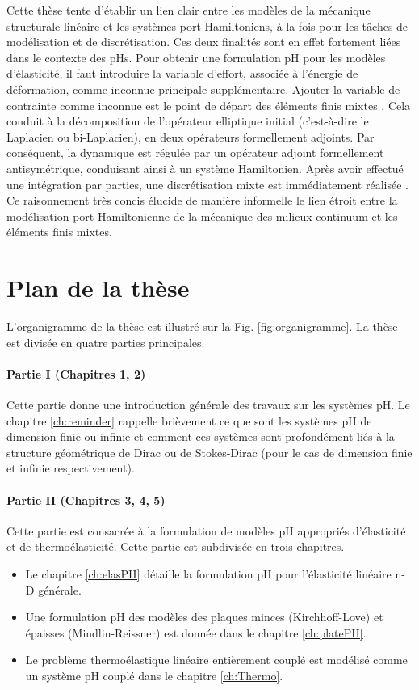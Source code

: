 Cette thèse tente d'établir un lien clair entre les modèles de la mécanique structurale linéaire et les systèmes port-Hamiltoniens, à la fois pour les tâches de modélisation et de discrétisation. Ces deux finalités sont en effet fortement liées dans le contexte des pHs. Pour obtenir une formulation pH pour les modèles d'élasticité, il faut introduire la variable d'effort, associée à l'énergie de déformation, comme inconnue principale supplémentaire. Ajouter la variable de contrainte comme inconnue est le point de départ des éléments finis mixtes \cite{arnold1990intro}. Cela conduit à la décomposition de l'opérateur elliptique initial (c'est-à-dire le Laplacien ou bi-Laplacien), en deux opérateurs formellement adjoints. Par conséquent, la dynamique est régulée par un opérateur adjoint formellement antisymétrique, conduisant ainsi à un système Hamiltonien. Après avoir effectué une intégration par parties, une discrétisation mixte est immédiatement réalisée \cite{joly2003variational}. Ce raisonnement très concis élucide de manière informelle le lien étroit entre la modélisation port-Hamiltonienne de la mécanique des milieux continuum et les éléments finis mixtes.

\section{Plan de la thèse}

L'organigramme de la thèse est illustré sur la Fig. \ref{fig:organigramme}. La thèse est divisée en quatre parties principales.

\paragraph{Partie I (Chapitres 1, 2)}
Cette partie donne une introduction générale des travaux sur les systèmes pH. Le chapitre \ref{ch:reminder} rappelle brièvement ce que sont les systèmes pH de dimension finie ou infinie et comment ces systèmes sont profondément liés à la structure géométrique de Dirac ou de Stokes-Dirac (pour le cas de dimension finie et infinie respectivement).

\paragraph{Partie II (Chapitres 3, 4, 5)}
Cette partie est consacrée à la formulation de modèles pH appropriés d'élasticité et de thermoélasticité. Cette partie est subdivisée en trois chapitres.
\begin{itemize}
\item Le chapitre \ref{ch:elasPH} détaille la formulation pH pour l'élasticité linéaire n-D générale.
\item Une formulation pH des modèles des plaques minces (Kirchhoff-Love) et épaisses (Mindlin-Reissner) est donnée dans le chapitre \ref{ch:platePH}.
\item Le problème thermoélastique linéaire entièrement couplé est modélisé comme un système pH couplé dans le chapitre \ref{ch:Thermo}.
\end{itemize}


